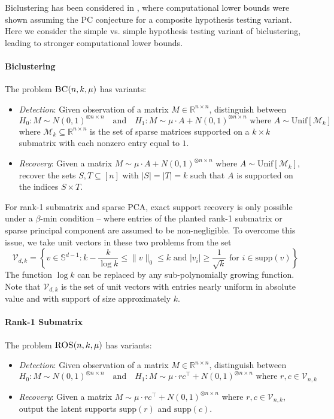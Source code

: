 \documentclass[11pt]{article}
\begin{document}
Biclustering has been considered in \cite{ma2015computational}, where computational lower bounds were shown assuming the PC conjecture for a composite hypothesis testing variant. Here we consider the simple vs. simple hypothesis testing variant of biclustering, leading to stronger computational lower bounds.

\paragraph{Biclustering} The problem $\textsc{BC}(n, k, \mu)$ has variants:
\begin{itemize}
\item \emph{Detection}: Given observation of a matrix $M \in \mathbb{R}^{n \times n}$, distinguish between
$$H_0: M \sim N(0, 1)^{\otimes n \times n} \quad \text{and} \quad H_1 : M \sim \mu \cdot A + N(0, 1)^{\otimes n \times n} \text{ where } A \sim \text{Unif}\left[\mathcal{M}_k\right]$$
where $\mathcal{M}_k \subseteq \mathbb{R}^{n \times n}$ is the set of sparse matrices supported on a $k \times k$ submatrix with each nonzero entry equal to $1$.
\item \emph{Recovery}: Given a matrix $M \sim \mu \cdot A + N(0, 1)^{\otimes n \times n}$ where $A \sim \text{Unif}\left[\mathcal{M}_k\right]$, recover the sets $S, T \subseteq [n]$ with $|S| = |T| = k$ such that $A$ is supported on the indices $S \times T$.
\end{itemize}

For rank-1 submatrix and sparse PCA, exact support recovery is only possible under a $\beta$-min condition -- where entries of the planted rank-1 submatrix or sparse principal component are assumed to be non-negligible. To overcome this issue, we take unit vectors in these two problems from the set
$$\mathcal{V}_{d,k} = \left\{ v \in \mathbb{S}^{d-1}  : k - \frac{k}{\log k} \le \| v \|_0 \le k \text{ and } |v_i| \ge \frac{1}{\sqrt{k}} \text{ for } i \in \text{supp}(v) \right\}$$
The function $\log k$ can be replaced by any sub-polynomially growing function. Note that $\mathcal{V}_{d, k}$ is the set of unit vectors with entries nearly uniform in absolute value and with support of size approximately $k$.

\paragraph{Rank-1 Submatrix} The problem $\textsc{ROS}(n, k, \mu)$ has variants:
\begin{itemize}
\item \emph{Detection}: Given observation of a matrix $M \in \mathbb{R}^{n \times n}$, distinguish between
$$H_0: M \sim N(0, 1)^{\otimes n \times n} \quad \text{and} \quad H_1 : M \sim \mu \cdot rc^\top + N(0, 1)^{\otimes n \times n} \text{ where } r, c \in \mathcal{V}_{n, k}$$
\item \emph{Recovery}: Given a matrix $M \sim \mu \cdot rc^\top + N(0, 1)^{\otimes n \times n}$ where $r, c \in \mathcal{V}_{n, k}$, output the latent supports $\text{supp}(r)$ and $\text{supp}(c)$.
\end{itemize}
\end{document}
